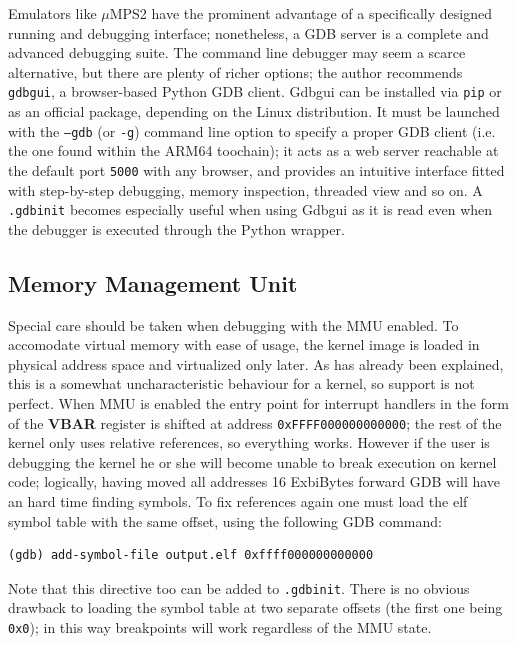 \documentclass[12pt,a4paper,openright,twoside]{report}
\begin{document}
Emulators like $\mu$MPS2 have the prominent advantage of a specifically designed
running and debugging interface; nonetheless, a GDB server is a complete and
advanced debugging suite. The command line debugger may seem a scarce alternative,
but there are plenty of richer options; the author recommends {\tt gdbgui}, 
a browser-based Python GDB client.
Gdbgui can be installed via {\tt pip} or as an official package, depending on 
the Linux distribution. It must be launched
with the {\tt --gdb} (or {\tt -g}) command line option to specify a proper GDB
client (i.e. the one found within the ARM64 toochain); it acts as a web server
reachable at the default port {\tt 5000} with any browser, and provides an intuitive
interface fitted with step-by-step debugging, memory inspection, threaded view and
so on.
A {\tt .gdbinit} becomes especially useful when using Gdbgui as it is read even 
when the debugger is executed through the Python wrapper.

\subsection{Memory Management Unit}
Special care should be taken when debugging with the MMU enabled. To accomodate
virtual memory with ease of usage, the kernel image is loaded in physical address
space and virtualized only later. As has already been explained, this is a somewhat
uncharacteristic behaviour for a kernel, so support is not perfect.
When MMU is enabled the entry point for interrupt handlers in the form of the
\textbf{VBAR} register is shifted at address {\tt 0xFFFF000000000000}; the rest
of the kernel only uses relative references, so everything works.
However if the user is debugging the kernel he or she will become unable to break
execution on kernel code; logically, having moved all addresses 16 ExbiBytes forward
GDB will have an hard time finding symbols. To fix references again one must
load the elf symbol table with the same offset, using the following GDB command:

\begin{lstlisting}
(gdb) add-symbol-file output.elf 0xffff000000000000
\end{lstlisting}

Note that this directive too can be added to {\tt .gdbinit}. There is no 
obvious drawback to loading the symbol table at two separate offsets (the first
one being {\tt 0x0}); in this way breakpoints will work regardless of the MMU state.
\end{document}

